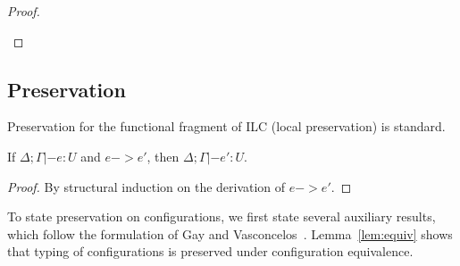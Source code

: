 \begin{theorem}[Progress]
\begin{proof}
\begin{itemize}[leftmargin=*]
\begin{llproof}




        
      \end{llproof}
    \end{itemize}    
\end{proof}  
\end{theorem}

\subsection{Preservation}

Preservation for the functional fragment of ILC (local preservation) is standard.

\begin{lemma}\label{lem:local-preservation}
  If $\Delta; \Gamma|- e : U$ and $e -> e'$, then $\Delta; \Gamma|- e' : U$.
  \begin{proof}
    By structural induction on the derivation of $e -> e'$.
  \end{proof}
\end{lemma}

To state preservation on configurations, we first state several auxiliary
results, which follow the formulation of Gay and
Vasconcelos~\cite{gay2010linear}.  Lemma~\ref{lem:equiv} shows that typing of
configurations is preserved under configuration equivalence.

